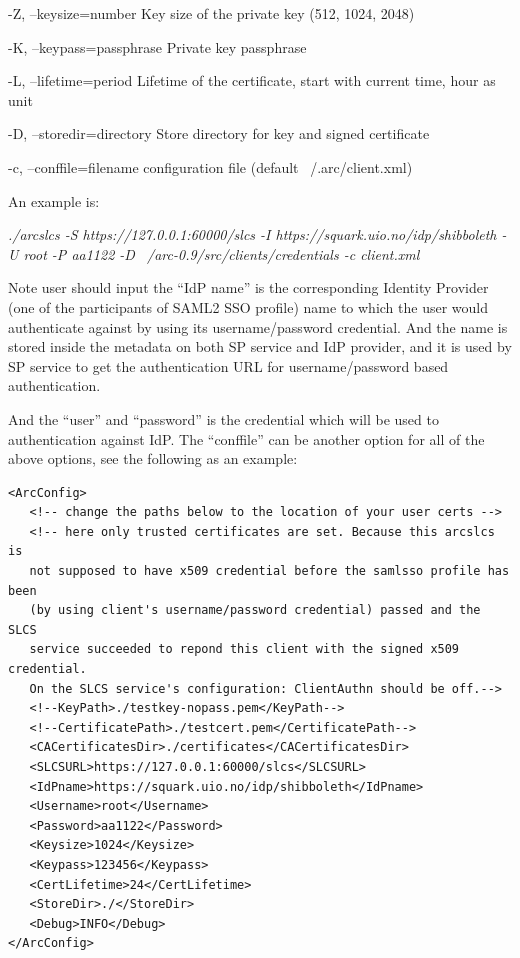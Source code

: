 \documentclass{article}                            %
\begin{document}
  -Z, --keysize=number         Key size of the private key (512, 1024, 2048) 

  -K, --keypass=passphrase     Private key passphrase 

  -L, --lifetime=period        Lifetime of the certificate, start with current time, hour as unit 

  -D, --storedir=directory     Store directory for key and signed certificate

  -c, --conffile=filename      configuration file (default ~/.arc/client.xml) 

An example is:

\textit{./arcslcs -S https://127.0.0.1:60000/slcs -I https://squark.uio.no/idp/shibboleth -U root -P aa1122 -D   ~/arc-0.9/src/clients/credentials -c client.xml}

    Note user should input the ``IdP name'' is the corresponding Identity Provider (one of the participants of SAML2 SSO profile) name to which the user would authenticate against by using its username/password credential. And the name is stored inside the metadata on both SP service and IdP provider, and it is used by SP service to get the authentication URL for username/password based authentication.

    And the ``user'' and ``password'' is the credential which will be used to authentication against IdP.
The ``conffile'' can be another option for all of the above options, see the following as an example:

\begin{verbatim}
<ArcConfig> 
   <!-- change the paths below to the location of your user certs --> 
   <!-- here only trusted certificates are set. Because this arcslcs is 
   not supposed to have x509 credential before the samlsso profile has been 
   (by using client's username/password credential) passed and the SLCS 
   service succeeded to repond this client with the signed x509 credential. 
   On the SLCS service's configuration: ClientAuthn should be off.--> 
   <!--KeyPath>./testkey-nopass.pem</KeyPath--> 
   <!--CertificatePath>./testcert.pem</CertificatePath--> 
   <CACertificatesDir>./certificates</CACertificatesDir> 
   <SLCSURL>https://127.0.0.1:60000/slcs</SLCSURL> 
   <IdPname>https://squark.uio.no/idp/shibboleth</IdPname> 
   <Username>root</Username> 
   <Password>aa1122</Password> 
   <Keysize>1024</Keysize> 
   <Keypass>123456</Keypass> 
   <CertLifetime>24</CertLifetime> 
   <StoreDir>./</StoreDir> 
   <Debug>INFO</Debug> 
</ArcConfig> 
\end{verbatim}
\end{document}
